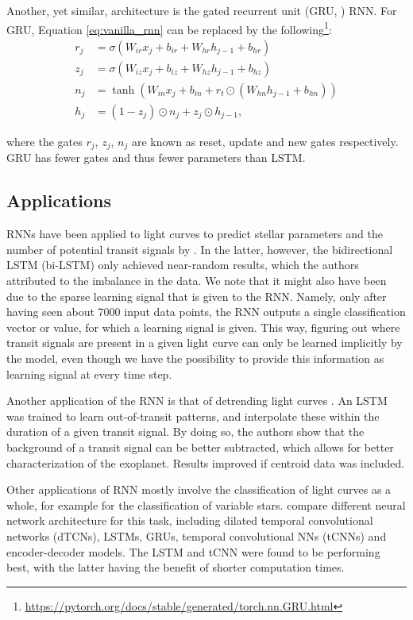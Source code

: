 Another, yet similar, architecture is the gated recurrent unit (GRU, \cite{cho2014learning}) RNN. For GRU, Equation \ref{eq:vanilla_rnn} can be replaced by the following\footnote{\url{https://pytorch.org/docs/stable/generated/torch.nn.GRU.html}}:
\begin{align}
    r_j &= \sigma(W_{ir}x_j + b_{ir} + W_{hr}h_{j-1} + b_{hr}) \\
    z_j &= \sigma(W_{iz}x_j + b_{iz} + W_{hz}h_{j-1} + b_{hz}) \\   
    n_j &= \tanh(W_{in}x_j + b_{in} + r_t \odot (W_{hn}h_{j-1} + b_{hn})) \\
    h_j &= (1 - z_j) \odot n_j + z_j \odot h_{j-1},
\end{align}

\noindent where the gates $r_j$, $z_j$, $n_j$ are known as reset, update and new gates respectively. GRU has fewer gates and thus fewer parameters than LSTM.

\subsection{Applications}

RNNs have been applied to light curves to predict stellar parameters and the number of potential transit signals by \cite{hinners2018machine}. In the latter, however, the bidirectional LSTM (bi-LSTM) only achieved near-random results, which the authors attributed to the imbalance in the data. We note that it might also have been due to the sparse learning signal that is given to the RNN. Namely, only after having seen about 7000 input data points, the RNN outputs a single classification vector or value, for which a learning signal is given. This way, figuring out where transit signals are present in a given light curve can only be learned implicitly by the model, even though we have the possibility to provide this information as learning signal at every time step.

Another application of the RNN is that of detrending light curves \citep{morvan2020detrending}. An LSTM was trained to learn out-of-transit patterns, and interpolate these within the duration of a given transit signal. By doing so, the authors show that the background of a transit signal can be better subtracted, which allows for better characterization of the exoplanet. Results improved if centroid data was included.

Other applications of RNN mostly involve the classification of light curves as a whole, for example for the classification of variable stars. \cite{jamal2020neural} compare different neural network architecture for this task, including dilated temporal convolutional networks (dTCNs), LSTMs, GRUs, temporal convolutional NNs (tCNNs) and encoder-decoder models. The LSTM and tCNN were found to be performing best, with the latter having the benefit of shorter computation times. 

